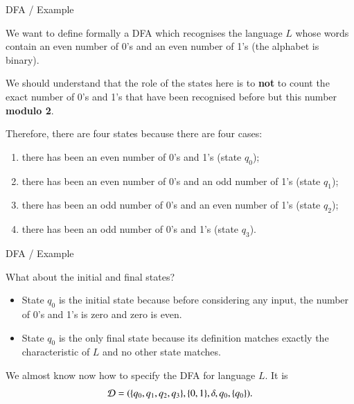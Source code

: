 \documentclass[compress,dvips,xcolor={dvipsnames},t]{beamer}
\begin{document}
%
\begin{frame}{DFA / Example}

We want to define formally a DFA which recognises the language \(L\)
whose words contain an even number of 0's and an even number of 1's
(the alphabet is binary).

\bigskip

We should understand that the role of the states here is to
\textbf{not} to count the exact number of 0's and 1's that have been
recognised before but this number \textbf{modulo 2}.

\bigskip

Therefore, there are four states because there are four cases:
\begin{enumerate}

  \item there has been an even number of 0's and 1's (state \(q_0\));

  \item there has been an even number of 0's and an odd number of 1's
    (state \(q_1\));

  \item there has been an odd number of 0's and an even number of 1's
    (state \(q_2\));

  \item there has been an odd number of 0's and 1's (state \(q_3\)).

\end{enumerate}

\end{frame}

%
\begin{frame}{DFA / Example}

What about the initial and final states?
\begin{itemize}

  \item State \(q_0\) is the initial state because before considering
  any input, the number of 0's and 1's is zero and zero is even.

  \item State \(q_0\) is the only final state because its definition
  matches exactly the characteristic of \(L\) and no other state
  matches.

\end{itemize}
We almost know now how to specify the DFA for language \(L\). It is
\[
{\cal D} = (\{q_0,q_1,q_2,q_3\}, \{0,1\}, \delta,q_0, \{q_0\}).
\]

\end{frame}
\end{document}
